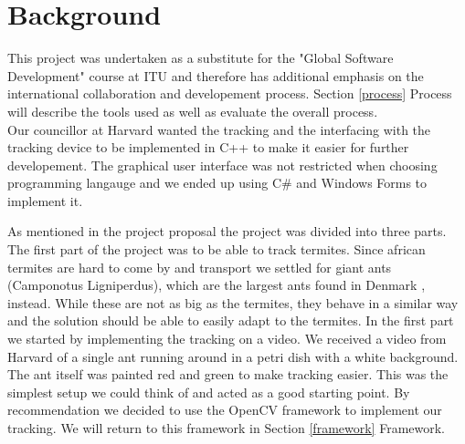 
\section{Background}


This project was undertaken as a substitute for the "Global Software Development" course at ITU and therefore has additional emphasis on the international collaboration and developement process. Section \ref{process} Process will describe the tools used as well as evaluate the overall process. \\ 

Our councillor at Harvard wanted the tracking and the interfacing with the tracking device to be implemented in C++ to make it easier for further developement. The graphical user interface was not restricted when choosing programming langauge and we ended up using C\# and Windows Forms to implement it.

As mentioned in the project proposal the project was divided into three parts. The first part of the project was to be able to track termites. Since african termites are hard to come by and transport we settled for giant ants (Camponotus Ligniperdus), which are the largest ants found in Denmark \cite{fogn}, instead. While these are not as big as the termites, they behave in a similar way and the solution should be able to easily adapt to the termites. In the first part we started by implementing the tracking on a video. We received a video from Harvard of a single ant running around in a petri dish with a white background. The ant itself was painted red and green to make tracking easier. This was the simplest setup we could think of and acted as a good starting point. By recommendation we decided to use the OpenCV \cite{opencv} framework to implement our tracking. We will return to this framework in Section \ref{framework} Framework. \\


